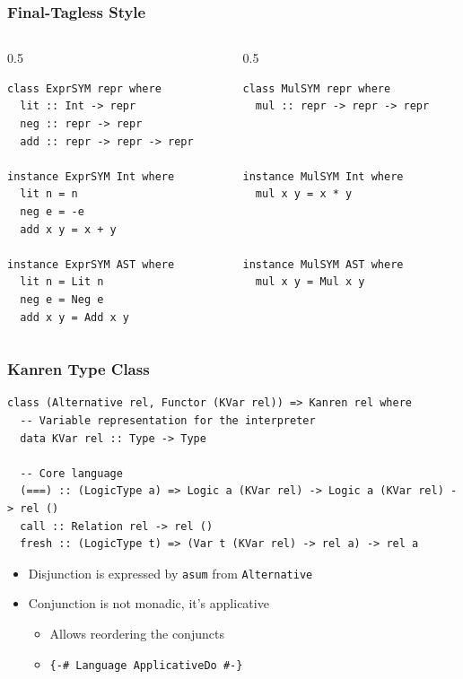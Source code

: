 \documentclass[xcolor={dvipsnames}, aspectratio=169]{beamer}
\begin{document}
\begin{frame}[fragile]
  \frametitle{Final-Tagless Style}
\begin{columns}
  \begin{column}[T]{0.5\textwidth}
\begin{lstlisting}[language=ocanren1]
class ExprSYM repr where 
  lit :: Int -> repr 
  neg :: repr -> repr 
  add :: repr -> repr -> repr 

instance ExprSYM Int where 
  lit n = n 
  neg e = -e 
  add x y = x + y 

instance ExprSYM AST where 
  lit n = Lit n  
  neg e = Neg e 
  add x y = Add x y    
\end{lstlisting}
\end{column}

\pause

\begin{column}[T]{0.5\textwidth}
\begin{lstlisting}[language=ocanren1]
class MulSYM repr where 
  mul :: repr -> repr -> repr 



instance MulSYM Int where 
  mul x y = x * y 



instance MulSYM AST where 
  mul x y = Mul x y 
\end{lstlisting}
\end{column}
\end{columns}
\end{frame}


\begin{frame}[fragile]
  \frametitle{Kanren Type Class}
\begin{lstlisting}[language=ocanren1]
class (Alternative rel, Functor (KVar rel)) => Kanren rel where
  -- Variable representation for the interpreter
  data KVar rel :: Type -> Type

  -- Core language
  (===) :: (LogicType a) => Logic a (KVar rel) -> Logic a (KVar rel) -> rel ()
  call :: Relation rel -> rel ()
  fresh :: (LogicType t) => (Var t (KVar rel) -> rel a) -> rel a
\end{lstlisting}

\vspace{0.5cm}

\begin{itemize}
  \item Disjunction is expressed by \lstinline{asum} from \lstinline{Alternative}
  \item Conjunction is not monadic, it's applicative
  \begin{itemize}
    \item Allows reordering the conjuncts
    \item \lstinline|{-# Language ApplicativeDo #-}|
  \end{itemize}
\end{itemize}
\end{frame}
\end{document}
